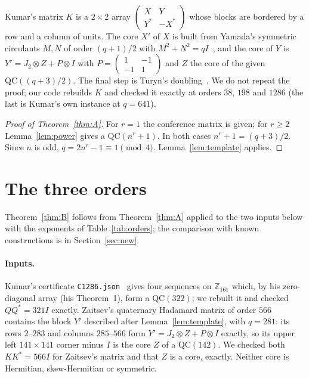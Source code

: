 \documentclass[10pt]{article}
\theoremstyle{remark}
\newcommand{\QC}{\mathrm{QC}}
\begin{document}
Kumar's matrix $K$ is a $2\times2$ array $\left(\begin{smallmatrix}X&Y\\Y^*&-X^*\end{smallmatrix}\right)$ whose blocks are bordered by a row and a column of units. The core $X'$ of $X$ is built from Yamada's symmetric circulants $M,N$ of order $(q+1)/2$ with $M^2+N^2=qI$~\cite{Ya89}, and the core of $Y$ is $Y'=J_2\otimes Z+P\otimes I$ with $P=\left(\begin{smallmatrix}1&-1\\-1&1\end{smallmatrix}\right)$ and $Z$ the core of the given $\QC((q+3)/2)$. The final step is Turyn's doubling~\cite{Tu70}. We do not repeat the proof; our code rebuilds $K$ and checked it exactly at orders $38$, $198$ and $1286$ (the last is Kumar's own instance at $q=641$).

\begin{proof}[Proof of Theorem~\ref{thm:A}]
For $r=1$ the conference matrix is given; for $r\ge2$ Lemma~\ref{lem:power} gives a $\QC(n^r+1)$. In both cases $n^r+1=(q+3)/2$. Since $n$ is odd, $q=2n^r-1\equiv1\pmod4$. Lemma~\ref{lem:template} applies.
\end{proof}

\section{The three orders}\label{sec:orders}
Theorem~\ref{thm:B} follows from Theorem~\ref{thm:A} applied to the two inputs below with the exponents of Table~\ref{tab:orders}; the comparison with known constructions is in Section~\ref{sec:new}.

\paragraph{Inputs.} Kumar's certificate \texttt{C1286.json}~\cite{Ku26} gives four sequences on $\mathbb Z_{161}$ which, by his zero-diagonal array (his Theorem~1), form a $\QC(322)$; we rebuilt it and checked $QQ^*=321I$ exactly. Zaitsev's quaternary Hadamard matrix of order $566$~\cite{Za26} contains the block $Y'$ described after Lemma~\ref{lem:template}, with $q=281$: its rows $2$--$283$ and columns $285$--$566$ form $Y'=J_2\otimes Z+P\otimes I$ exactly, so its upper left $141\times141$ corner minus $I$ is the core $Z$ of a $\QC(142)$. We checked both $KK^*=566I$ for Zaitsev's matrix and that $Z$ is a core, exactly. Neither core is Hermitian, skew-Hermitian or symmetric.
\end{document}
